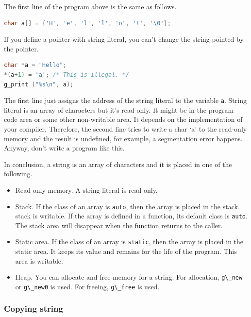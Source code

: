 The first line of the program above is the same as follows.

\begin{lstlisting}[language=C]
char a[] = {'H', 'e', 'l', 'l', 'o', '!', '\0'};
\end{lstlisting}

If you define a pointer with string literal, you can't change the string
pointed by the pointer.

\begin{lstlisting}[language=C]
char *a = "Hello";
*(a+1) = 'a'; /* This is illegal. */
g_print ("%s\n", a);
\end{lstlisting}

The first line just assigns the address of the string literal to the
variable \passthrough{\lstinline!a!}. String literal is an array of
characters but it's read-only. It might be in the program code area or
some other non-writable area. It depends on the implementation of your
compiler. Therefore, the second line tries to write a char `a' to the
read-only memory and the result is undefined, for example, a
segmentation error happens. Anyway, don't write a program like this.

In conclusion, a string is an array of characters and it is placed in
one of the following.

\begin{itemize}
\tightlist
\item
  Read-only memory. A string literal is read-only.
\item
  Stack. If the class of an array is \passthrough{\lstinline!auto!},
  then the array is placed in the stack. stack is writable. If the array
  is defined in a function, its default class is
  \passthrough{\lstinline!auto!}. The stack area will disappear when the
  function returns to the caller.
\item
  Static area. If the class of an array is
  \passthrough{\lstinline!static!}, then the array is placed in the
  static area. It keeps its value and remains for the life of the
  program. This area is writable.
\item
  Heap. You can allocate and free memory for a string. For allocation,
  \passthrough{\lstinline!g\_new!} or \passthrough{\lstinline!g\_new0!}
  is used. For freeing, \passthrough{\lstinline!g\_free!} is used.
\end{itemize}

\subsubsection{Copying string}\label{copying-string}

